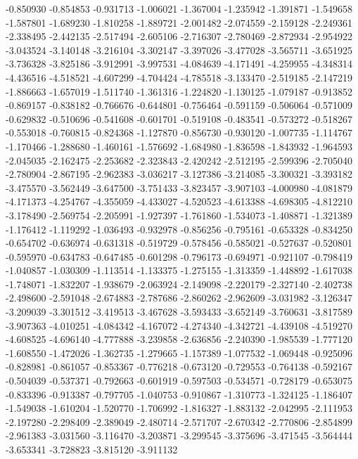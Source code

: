 -0.850930
-0.854853
-0.931713
-1.006021
-1.367004
-1.235942
-1.391871
-1.549658
-1.587801
-1.689230
-1.810258
-1.889721
-2.001482
-2.074559
-2.159128
-2.249361
-2.338495
-2.442135
-2.517494
-2.605106
-2.716307
-2.780469
-2.872934
-2.954922
-3.043524
-3.140148
-3.216104
-3.302147
-3.397026
-3.477028
-3.565711
-3.651925
-3.736328
-3.825186
-3.912991
-3.997531
-4.084639
-4.171491
-4.259955
-4.348314
-4.436516
-4.518521
-4.607299
-4.704424
-4.785518
-3.133470
-2.519185
-2.147219
-1.886663
-1.657019
-1.511740
-1.361316
-1.224820
-1.130125
-1.079187
-0.913852
-0.869157
-0.838182
-0.766676
-0.644801
-0.756464
-0.591159
-0.506064
-0.571009
-0.629832
-0.510696
-0.541608
-0.601701
-0.519108
-0.483541
-0.573272
-0.518267
-0.553018
-0.760815
-0.824368
-1.127870
-0.856730
-0.930120
-1.007735
-1.114767
-1.170466
-1.288680
-1.460161
-1.576692
-1.684980
-1.836598
-1.843932
-1.964593
-2.045035
-2.162475
-2.253682
-2.323843
-2.420242
-2.512195
-2.599396
-2.705040
-2.780904
-2.867195
-2.962383
-3.036217
-3.127386
-3.214085
-3.300321
-3.393182
-3.475570
-3.562449
-3.647500
-3.751433
-3.823457
-3.907103
-4.000980
-4.081879
-4.171373
-4.254767
-4.355059
-4.433027
-4.520523
-4.613388
-4.698305
-4.812210
-3.178490
-2.569754
-2.205991
-1.927397
-1.761860
-1.534073
-1.408871
-1.321389
-1.176412
-1.119292
-1.036493
-0.932978
-0.856256
-0.795161
-0.653328
-0.834250
-0.654702
-0.636974
-0.631318
-0.519729
-0.578456
-0.585021
-0.527637
-0.520801
-0.595970
-0.634783
-0.647485
-0.601298
-0.796173
-0.694971
-0.921107
-0.798419
-1.040857
-1.030309
-1.113514
-1.133375
-1.275155
-1.313359
-1.448892
-1.617038
-1.748071
-1.832207
-1.938679
-2.063924
-2.149098
-2.220179
-2.327140
-2.402738
-2.498600
-2.591048
-2.674883
-2.787686
-2.860262
-2.962609
-3.031982
-3.126347
-3.209039
-3.301512
-3.419513
-3.467628
-3.593433
-3.652149
-3.760631
-3.817589
-3.907363
-4.010251
-4.084342
-4.167072
-4.274340
-4.342721
-4.439108
-4.519270
-4.608525
-4.696140
-4.777888
-3.239858
-2.636856
-2.240390
-1.985539
-1.777120
-1.608550
-1.472026
-1.362735
-1.279665
-1.157389
-1.077532
-1.069448
-0.925096
-0.828981
-0.861057
-0.853367
-0.776218
-0.673120
-0.729553
-0.764138
-0.592167
-0.504039
-0.537371
-0.792663
-0.601919
-0.597503
-0.534571
-0.728179
-0.653075
-0.833396
-0.913387
-0.797705
-1.040753
-0.910867
-1.310773
-1.324125
-1.186407
-1.549038
-1.610204
-1.520770
-1.706992
-1.816327
-1.883132
-2.042995
-2.111953
-2.197280
-2.298409
-2.389049
-2.480714
-2.571707
-2.670342
-2.770806
-2.854899
-2.961383
-3.031560
-3.116470
-3.203871
-3.299545
-3.375696
-3.471545
-3.564444
-3.653341
-3.728823
-3.815120
-3.911132
